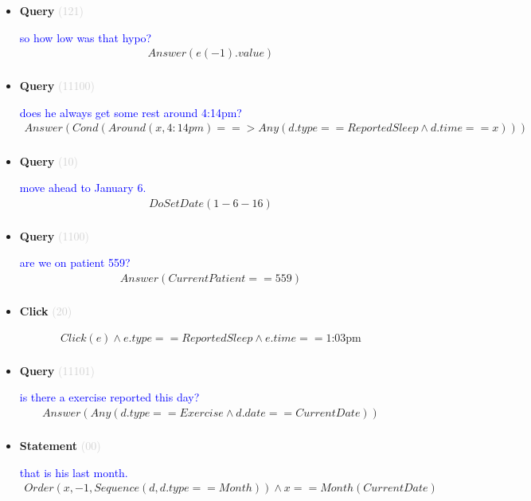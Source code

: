\documentclass[11pt]{article}
\newcommand{\key}[1]{\textcolor{lightgray}{#1}}
\newcounter{CQuery}
\newcounter{CStatement}
\newcounter{CClick}
\begin{document}
\begin{itemize}
\item
\textbf{Query\theCQuery} \key{(121)} \addtocounter{CQuery}{1}
\textcolor{blue}{ so how low was that hypo? }
\begin{multline*}
Answer(e(-1).value) \\ 
\end{multline*}


\item
\textbf{Query\theCQuery} \key{(11100)} \addtocounter{CQuery}{1}
\textcolor{blue}{ does he always get some rest around 4:14pm? }
\begin{multline*}
Answer(Cond(Around(x, 4:14pm) ==> Any(d.type==ReportedSleep \wedge d.time==x))) \\ 
\end{multline*}


\item
\textbf{Query\theCQuery} \key{(10)} \addtocounter{CQuery}{1}
\textcolor{blue}{ move ahead to January 6. }
\begin{multline*}
DoSetDate(1-6-16) \\ 
\end{multline*}


\item
\textbf{Query\theCQuery} \key{(1100)} \addtocounter{CQuery}{1}
\textcolor{blue}{ are we on patient 559? }
\begin{multline*}
Answer(CurrentPatient==559) \\ 
\end{multline*}


\item
\textbf{Click\theCClick} \key{(20)} \addtocounter{CClick}{1}
\textcolor{blue}{  }
\begin{multline*}
Click(e) \wedge e.type==ReportedSleep \wedge e.time==\mbox{1:03pm} \\ 
\end{multline*}


\item
\textbf{Query\theCQuery} \key{(11101)} \addtocounter{CQuery}{1}
\textcolor{blue}{ is there a exercise reported this day? }
\begin{multline*}
Answer(Any(d.type==Exercise \wedge d.date==CurrentDate)) \\ 
\end{multline*}


\item
\textbf{Statement\theCStatement} \key{(00)} \addtocounter{CStatement}{1}
\textcolor{blue}{ that is his last month. }
\begin{multline*}
Order(x, -1, Sequence(d, d.type==Month)) \wedge x==Month(CurrentDate) \\ 
\end{multline*}



\end{itemize}
\end{document}

